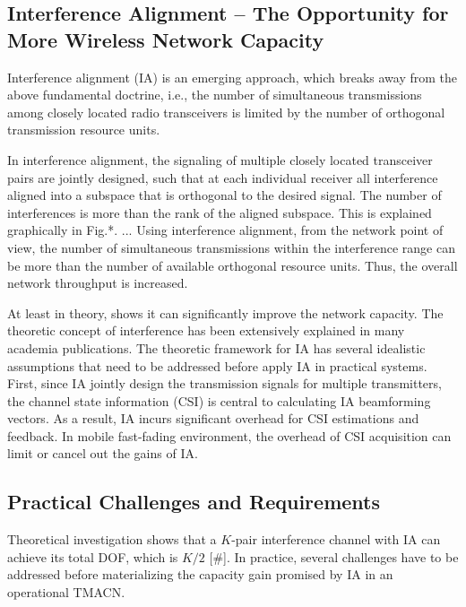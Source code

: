 \documentclass[letterpaper,11pt,onecolumn]{article}
\begin{document}
\subsection{Interference Alignment -- The Opportunity for More Wireless Network Capacity}

Interference alignment (IA) is an emerging approach, which breaks away from the above fundamental doctrine, i.e., the number of simultaneous transmissions among closely located radio transceivers is limited by the number of orthogonal transmission resource units.  

 In interference alignment, the signaling of multiple closely located transceiver pairs are jointly designed, such that at each individual receiver all interference aligned into a subspace that is orthogonal to the desired signal. The number of interferences is more than the rank of the aligned subspace. This is explained graphically in Fig.*. ... Using interference alignment, from the network point of view, the number of simultaneous transmissions within the interference range can be more than the number of available orthogonal resource units. Thus, the overall network throughput is increased.

At least in theory, shows it can significantly improve the network capacity. The theoretic concept of interference has been extensively explained in many academia publications. The theoretic framework for IA has several idealistic assumptions that need to be addressed before apply IA in practical systems. First, since IA jointly design the transmission signals for multiple transmitters, the channel state information (CSI) is central to calculating IA beamforming vectors. As a result, IA incurs significant overhead for CSI estimations and feedback. In mobile fast-fading environment, the overhead of CSI acquisition can limit or cancel out the gains of IA. 

\subsection{Practical Challenges and Requirements}

Theoretical investigation shows that a $K$-pair interference channel with IA can achieve its total DOF, which is $K/2$ [\#].  In practice, several challenges have to be addressed before materializing the capacity gain promised by IA in an operational TMACN.
\end{document}
